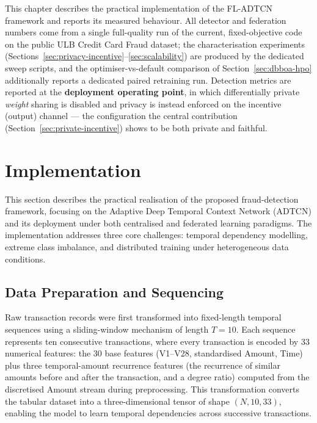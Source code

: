 
This chapter describes the practical implementation of the FL-ADTCN framework and reports its measured behaviour. All detector and federation numbers come from a single full-quality run of the current, fixed-objective code on the public ULB Credit Card Fraud dataset; the characterisation experiments (Sections~\ref{sec:privacy-incentive}--\ref{sec:scalability}) are produced by the dedicated sweep scripts, and the optimiser-vs-default comparison of Section~\ref{sec:dbboa-hpo} additionally reports a dedicated paired retraining run. Detection metrics are reported at the \textbf{deployment operating point}, in which differentially private \emph{weight} sharing is disabled and privacy is instead enforced on the incentive (output) channel — the configuration the central contribution (Section~\ref{sec:private-incentive}) shows to be both private and faithful.

\section{Implementation}
\label{sec:implementation}

This section describes the practical realisation of the proposed fraud-detection framework, focusing on the Adaptive Deep Temporal Context Network (ADTCN) and its deployment under both centralised and federated learning paradigms. The implementation addresses three core challenges: temporal dependency modelling, extreme class imbalance, and distributed training under heterogeneous data conditions.

\subsection*{Data Preparation and Sequencing}

Raw transaction records were first transformed into fixed-length temporal sequences using a sliding-window mechanism of length $T=10$. Each sequence represents ten consecutive transactions, where every transaction is encoded by 33 numerical features: the 30 base features (V1--V28, standardised Amount, Time) plus three temporal-amount recurrence features (the recurrence of similar amounts before and after the transaction, and a degree ratio) computed from the discretised Amount stream during preprocessing. This transformation converts the tabular dataset into a three-dimensional tensor of shape $(N, 10, 33)$, enabling the model to learn temporal dependencies across successive transactions.

